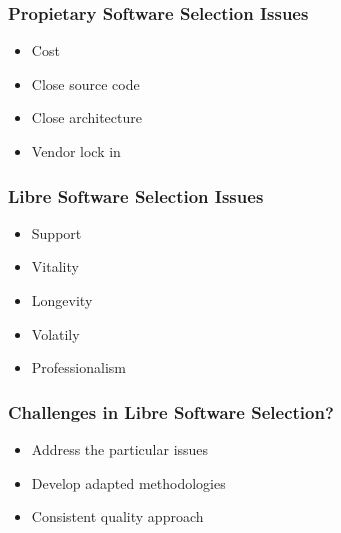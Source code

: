 \documentclass{beamer}
\begin{document}

\begin{frame}
 \frametitle{Propietary Software Selection Issues}
 \begin{itemize}
 \item Cost
 \item Close source code
 \item Close architecture
 \item Vendor lock in
 \end{itemize}
\end{frame}


\begin{frame}
 \frametitle{Libre Software Selection Issues}
 \begin{itemize}
 \item Support
 \item Vitality
 \item Longevity
 \item Volatily
 \item Professionalism
 \end{itemize}
\end{frame}



\begin{frame}
 \frametitle{Challenges in Libre Software Selection?}
 \begin{itemize}
 \item Address the particular issues
 \item Develop adapted methodologies
 \item Consistent quality approach
 \end{itemize}
\end{frame}
\end{document}
